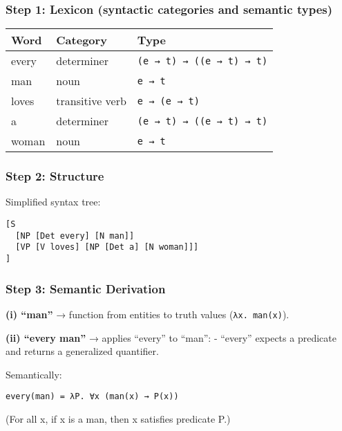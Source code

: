 \documentclass[12pt]{article}
\begin{document}
\hypertarget{step-1-lexicon-syntactic-categories-and-semantic-types}{%
\subsubsection{Step 1: Lexicon (syntactic categories and semantic
types)}\label{step-1-lexicon-syntactic-categories-and-semantic-types}}

\begin{longtable}[]{@{}lll@{}}
\toprule
Word & Category & Type \\
\midrule
\endhead
every & determiner & \texttt{(e\ →\ t)\ →\ ((e\ →\ t)\ →\ t)} \\
man & noun & \texttt{e\ →\ t} \\
loves & transitive verb & \texttt{e\ →\ (e\ →\ t)} \\
a & determiner & \texttt{(e\ →\ t)\ →\ ((e\ →\ t)\ →\ t)} \\
woman & noun & \texttt{e\ →\ t} \\
\bottomrule
\end{longtable}

\hypertarget{step-2-structure}{%
\subsubsection{Step 2: Structure}\label{step-2-structure}}

Simplified syntax tree:

\begin{verbatim}
[S
  [NP [Det every] [N man]]
  [VP [V loves] [NP [Det a] [N woman]]]
]
\end{verbatim}

\hypertarget{step-3-semantic-derivation}{%
\subsubsection{Step 3: Semantic
Derivation}\label{step-3-semantic-derivation}}

\textbf{(i) ``man''} → function from entities to truth values
(\texttt{λx.\ man(x)}).

\textbf{(ii) ``every man''} → applies ``every'' to ``man'': - ``every''
expects a predicate and returns a generalized quantifier.

Semantically:

\begin{verbatim}
every(man) = λP. ∀x (man(x) → P(x))
\end{verbatim}

(For all x, if x is a man, then x satisfies predicate P.)
\end{document}
